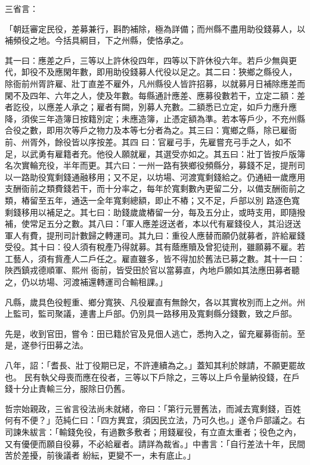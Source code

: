 \begin{pinyinscope}
 三省言：



 「朝廷審定民役，差募兼行，斟酌補除，極為詳備；而州縣不盡用助役錢募人，以補頻役之地。今括具綱目，下之州縣，使恪承之。



 其一曰：應差之戶，三等以上許休役四年，四等以下許休役六年。若戶少無與更代，卸役不及應閑年數，即用助役錢募人代役以足之。其二曰：狹鄉之縣役人，
 除衙前州胥許雇、壯丁直差不雇外，凡州縣役人皆許招募，以就募月日補除應差而閑不及四年、六年之人，使及年數。每縣通計應差、應募役數若干，立定二額：差者訖役，以應差人承之；雇者有闕，別募人充數。二額悉已立定，如戶力應升應降，須俟三年造簿日按籍別定；未應造簿，止憑定額為準。若本等戶少，不充州縣合役之數，即用次等戶之物力及本等七分者為之。其三曰：寬鄉之縣，除已雇衙前、州胥外，餘役皆以序按差。其四
 曰：官雇弓手，先雇嘗充弓手之人，如不足，以武勇有雇籍者充。他役人願就雇，其選受亦如之。其五曰：壯丁皆按戶版簿名次實輪充役，半年而更。其六曰：一州一路有狹鄉役頻縣分，募錢不足，提刑司以一路助役寬剩錢通融移用；又不足，以坊場、河渡寬剩錢給之。仍通紐一歲應用支酬衙前之類費錢若干，而十分率之，每年於寬剩數內更留二分，以備支酬衙前之類，樁留至五年，通迭一全年寬剩總額，即止不樁；又不足，戶部以別
 路逐色寬剩錢移用以補足之。其七曰：助錢歲歲樁留一分，每及五分止，或時支用，即隨撥補，使常足五分之數。其八曰：「軍人應差迓送者，本以代有雇錢役人，其沿迓送軍人有費，提刑司計數歸之轉運司。其九曰：重役人應替而願仍就募者，許給雇錢受役。其十曰：役人須有稅產乃得就募。其有蔭應贖及曾犯徒刑，雖願募不雇。若工藝人，須有貲產人二戶任之。雇直雖多，皆不得加於舊法已募之數。其十一曰：陜西鎮戎德順軍、熙州
 衙前，皆受田於官以當募直，內地戶願如其法應田募者聽之，仍以坊場、河渡補還轉運司合輸租課。」



 凡縣，歲具色役輕重、鄉分寬狹、凡役雇直有無餘欠，各以其實枚別而上之州。州上監司，監司聚議，連書上戶部。仍別具一路移用及寬剩縣分錢數，致之戶部。



 先是，收到官田，嘗令：田已籍於官及見佃人逃亡，悉拘入之，留充雇募衙前。至是，遂參行田募之法。



 八年，詔：「耆長、壯丁役期已足，不許連續為之。」蓋知其利於賕請，不願更罷故也。
 民有執父母喪而應在役者，三等以下戶除之，三等以上戶令量納役錢，在戶錢十分止責輸三分，服除日仍舊。



 哲宗始親政，三省言役法尚未就緒，帝曰：「第行元豐舊法，而減去寬剩錢，百姓何有不便？」范純仁曰：「四方異宜，須因民立法，乃可久也。」遂令戶部議之。右司諫朱紱言：「輸錢免役，有過數多敷者；用錢雇役，有立直太重者；役色之內，又有優便而願自役募，不必給雇者。請詳為裁省。」中書言：「自行差法十年，民間苦於差擾，前後議者
 紛紜，更變不一，未有底止。」




\end{pinyinscope}
